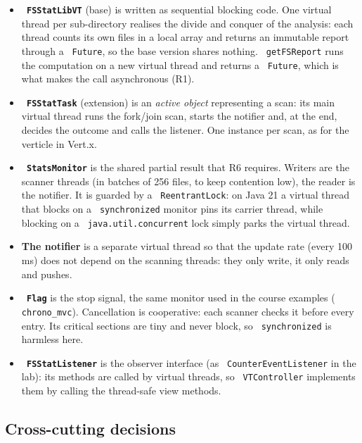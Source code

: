 \documentclass[11pt,a4paper]{article}
\newcommand{\code}[1]{\texttt{\hyphenchar\font=-1 #1}}
\begin{document}
\begin{itemize}
  \item \textbf{\code{FSStatLibVT}} (base) is written as sequential blocking code. One virtual thread
        per sub-directory realises the divide and conquer of the analysis: each thread counts its own
        files in a local array and returns an immutable report through a \code{Future}, so the base
        version shares nothing. \code{getFSReport} runs the computation on a new virtual thread and
        returns a \code{Future}, which is what makes the call asynchronous (R1).
  \item \textbf{\code{FSStatTask}} (extension) is an \emph{active object} representing a scan: its
        main virtual thread runs the fork/join scan, starts the notifier and, at the end, decides the
        outcome and calls the listener. One instance per scan, as for the verticle in Vert.x.
  \item \textbf{\code{StatsMonitor}} is the shared partial result that R6 requires. Writers are the
        scanner threads (in batches of 256 files, to keep contention low), the reader is the notifier.
        It is guarded by a \code{ReentrantLock}: on Java 21 a virtual thread that blocks on a
        \code{synchronized} monitor pins its carrier thread, while blocking on a
        \code{java.util.concurrent} lock simply parks the virtual thread.
  \item \textbf{The notifier} is a separate virtual thread so that the update rate (every 100\,ms) does
        not depend on the scanning threads: they only write, it only reads and pushes.
  \item \textbf{\code{Flag}} is the stop signal, the same monitor used in the course examples
        (\code{chrono\_mvc}). Cancellation is cooperative: each scanner checks it before every entry.
        Its critical sections are tiny and never block, so \code{synchronized} is harmless here.
  \item \textbf{\code{FSStatListener}} is the observer interface (as \code{CounterEventListener} in the
        lab): its methods are called by virtual threads, so \code{VTController} implements them by
        calling the thread-safe view methods.
\end{itemize}

\subsection{Cross-cutting decisions}
\end{document}
